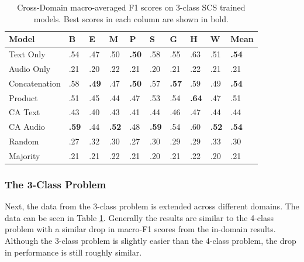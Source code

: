 \documentclass[twocolumn,twoside]{article}
\begin{document}
\begin{table}[t]
\centering
\caption{Cross-Domain macro-averaged F1 scores on 3-class SCS trained models. Best scores in each column are shown in bold. \label{tbl:cross-3-SCS}}
\begin{tabular}{|l|llllllll|l|}
\hline
Model         & B            & E            & M            & P            & S            & G            & H            & W            & Mean  \\ \hline
Text Only     & .54          & .47          & .50          & \textbf{.50} & .58          & .55          & .63          & .51          & \textbf{.54} \\
Audio Only    & .21          & .20          & .22          & .21          & .20          & .21          & .22          & .21          & .21           \\ \hline
Concatenation & .58          & \textbf{.49} & .47          & \textbf{.50} & .57          & \textbf{.57} & .59          & .49          & \textbf{.54} \\
Product       & .51          & .45          & .44          & .47          & .53          & .54          & \textbf{.64} & .47          & .51          \\
CA Text       & .43          & .40          & .43          & .41          & .44          & .46          & .47          & .44          & .44          \\
CA Audio      & \textbf{.59} & .44          & \textbf{.52} & .48          & \textbf{.59} & .54          & .60          & \textbf{.52} & \textbf{.54} \\ \hline
Random        & .27          & .32          & .30          & .27          & .30          & .29          & .29          & .33          & .30          \\
Majority      & .21          & .21          & .22          & .21          & .20          & .21          & .22          & .20          & .21           \\ \hline
\end{tabular}
\end{table}

\subsubsection{The 3-Class Problem}\label{sec:cd-3class}

Next, the data from the 3-class problem is extended across different
domains. The data can be seen in Table \ref{tbl:cross-3-SCS}. Generally
the results are similar to the 4-class problem with a similar drop in
macro-F1 scores from the in-domain results. Although the 3-class problem
is slightly easier than the 4-class problem, the drop in performance is
still roughly similar.
\end{document}

